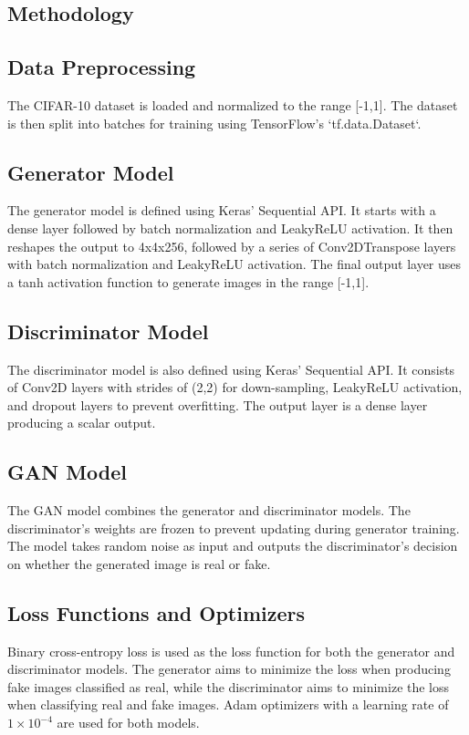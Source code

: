 \documentclass{article}
\begin{document}
\subsection{Methodology}

\subsection{Data Preprocessing}
The CIFAR-10 dataset is loaded and normalized to the range [-1,1]. The dataset is then split into batches for training using TensorFlow's `tf.data.Dataset`.

\subsection{Generator Model}
The generator model is defined using Keras' Sequential API. It starts with a dense layer followed by batch normalization and LeakyReLU activation. It then reshapes the output to 4x4x256, followed by a series of Conv2DTranspose layers with batch normalization and LeakyReLU activation. The final output layer uses a tanh activation function to generate images in the range [-1,1].

\subsection{Discriminator Model}
The discriminator model is also defined using Keras' Sequential API. It consists of Conv2D layers with strides of (2,2) for down-sampling, LeakyReLU activation, and dropout layers to prevent overfitting. The output layer is a dense layer producing a scalar output.

\subsection{GAN Model}
The GAN model combines the generator and discriminator models. The discriminator's weights are frozen to prevent updating during generator training. The model takes random noise as input and outputs the discriminator's decision on whether the generated image is real or fake.

\subsection{Loss Functions and Optimizers}
Binary cross-entropy loss is used as the loss function for both the generator and discriminator models. The generator aims to minimize the loss when producing fake images classified as real, while the discriminator aims to minimize the loss when classifying real and fake images. Adam optimizers with a learning rate of $1 \times 10^{-4}$ are used for both models.
\end{document}
